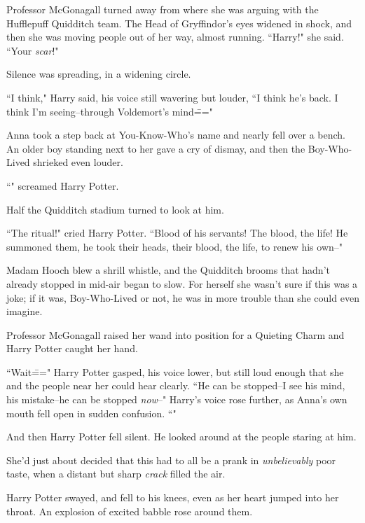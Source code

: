 Professor McGonagall turned away from where she was arguing with the Hufflepuff Quidditch team. The Head of Gryffindor's eyes widened in shock, and then she was moving people out of her way, almost running. ``Harry!" she said. ``Your \emph{scar}!"

Silence was spreading, in a widening circle.

``I think," Harry said, his voice still wavering but louder, ``I think he's back. I think I'm seeing\---through Voldemort's mind\==="

Anna took a step back at You-Know-Who's name and nearly fell over a bench. An older boy standing next to her gave a cry of dismay, and then the Boy-Who-Lived shrieked even louder.

``" screamed Harry Potter.

Half the Quidditch stadium turned to look at him.

``The ritual!" cried Harry Potter. ``Blood of his servants! The blood, the life! He summoned them, he took their heads, their blood, the life, to renew his own\---"

Madam Hooch blew a shrill whistle, and the Quidditch brooms that hadn't already stopped in mid-air began to slow. For herself she wasn't sure if this was a joke; if it was, Boy-Who-Lived or not, he was in more trouble than she could even imagine.

Professor McGonagall raised her wand into position for a Quieting Charm and Harry Potter caught her hand.

``Wait\===" Harry Potter gasped, his voice lower, but still loud enough that she and the people near her could hear clearly. ``He can be stopped\---I see his mind, his mistake\---he can be stopped \emph{now}\---" Harry's voice rose further, as Anna's own mouth fell open in sudden confusion. ``"

And then Harry Potter fell silent. He looked around at the people staring at him.

She'd just about decided that this had to all be a prank in \emph{unbelievably} poor taste, when a distant but sharp \emph{crack} filled the air.

Harry Potter swayed, and fell to his knees, even as her heart jumped into her throat. An explosion of excited babble rose around them.

